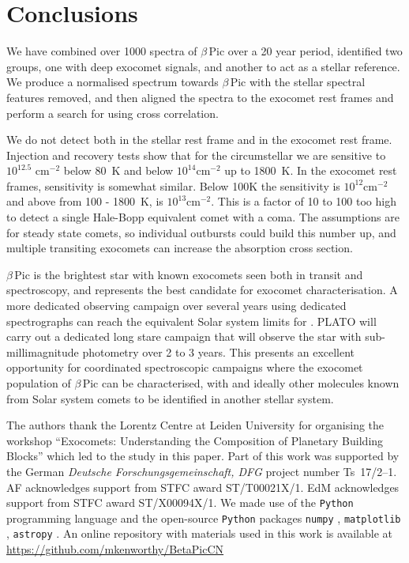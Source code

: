 \documentclass{aa}
\newcommand{\bp}{$\beta$\,Pic}
\begin{document}
\section{Conclusions}\label{sec:conclusion}

We have combined over 1000 spectra of \bp{} over a 20 year period, identified two groups, one with deep exocomet signals, and another to act as a stellar reference.
%
We produce a normalised spectrum towards \bp{} with the stellar spectral features removed, and then aligned the spectra to the exocomet rest frames and perform a search for  using cross correlation.

We do not detect  both in the stellar rest frame and in the exocomet rest frame.
%
Injection and recovery tests show that for the circumstellar  we are sensitive to $10^{12.5}$ cm$^{-2}$ below 80~K and below $10^{14}$cm$^{-2}$ up to 1800~K.
%
In the exocomet rest frames, sensitivity is somewhat similar.
%
Below 100K the sensitivity is $10^{12}$cm$^{-2}$ and above from 100 - 1800~K, is $10^{13}$cm$^{-2}$.
%
This is a factor of 10 to 100 too high to detect a single Hale-Bopp equivalent comet with a  coma.
%
The assumptions are for steady state comets, so individual outbursts could build this number up, and multiple transiting exocomets can increase the absorption cross section.

\bp{} is the brightest star with known exocomets seen both in transit and spectroscopy, and represents the best candidate for exocomet characterisation.
%
A more dedicated observing campaign over several years using dedicated spectrographs can reach the equivalent Solar system limits for .
%
PLATO will carry out a dedicated long stare campaign that will observe the star with sub-millimagnitude photometry over 2 to 3 years.
%
This presents an excellent opportunity for coordinated spectroscopic campaigns where the exocomet population of \bp{} can be characterised, with  and ideally other molecules known from Solar system comets to be identified in another stellar system.

\begin{acknowledgements}

The authors thank the Lorentz Centre at Leiden University for organising the workshop ``Exocomets: Understanding the Composition of Planetary Building Blocks'' which led to the study in this paper. 
%
Part of this work was supported by the German \emph{Deut\-sche For\-schungs\-ge\-mein\-schaft, DFG\/} project number Ts~17/2--1.
%
AF acknowledges support from STFC award ST/T00021X/1. EdM acknowledges support from STFC award ST/X00094X/1.
%
We made use of the {\tt Python} programming language \citep{rossum1995} and the open-source {\tt Python} packages {\tt numpy} \citep{walt2011}, {\tt matplotlib} \citep{hunter2007}, {\tt astropy} \citep{astropy2013}.
%      
An online repository with materials used in this work is available at \url{https://github.com/mkenworthy/BetaPicCN}

\end{acknowledgements}
\end{document}
